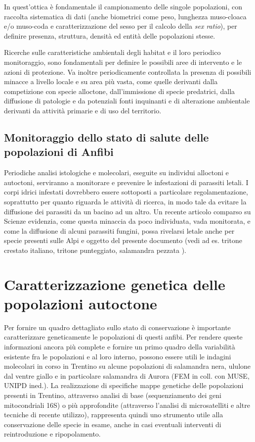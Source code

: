 \documentclass[10pt,twoside,openany,x11names,svgnames,italian,a5paper,dvipsnames,table]{memoir}
\begin{document}
In quest’ottica è fondamentale il campionamento delle singole popolazioni, con raccolta sistematica di dati (anche biometrici come peso, lunghezza muso-cloaca e/o muso-coda e caratterizzazione del sesso per il calcolo della \emph{sex ratio}), per definire presenza, struttura, densità ed entità delle popolazioni stesse. 

Ricerche sulle caratteristiche ambientali degli habitat e il loro periodico monitoraggio, sono fondamentali per definire le possibili aree di intervento e le azioni di protezione. Va inoltre periodicamente controllata la presenza di possibili minacce a livello locale e su area più vasta, come quelle derivanti dalla competizione con specie alloctone, dall’immissione di specie predatrici, dalla diffusione di patologie e da potenziali fonti inquinanti e di alterazione ambientale derivanti da attività primarie e di uso del territorio.

\subsection{Monitoraggio dello stato di salute delle popolazioni di Anfibi}
Periodiche analisi istologiche e molecolari, eseguite su individui alloctoni e autoctoni, serviranno a monitorare e prevenire le infestazioni di parassiti letali. I corpi idrici infestati dovrebbero essere sottoposti a particolare regolamentazione, soprattutto per quanto riguarda le attività di ricerca, in modo tale da evitare la diffusione dei parassiti da un bacino ad un altro. Un recente articolo comparso su Scienze evidenzia, come questa minaccia da poco individuata, vada monitorata, e come la diffusione di alcuni parassiti fungini, possa rivelarsi letale anche per specie presenti sulle Alpi e oggetto del presente documento (vedi ad es. tritone crestato italiano, tritone punteggiato, salamandra pezzata \cite{Martel14}).

\section{Caratterizzazione genetica delle popolazioni autoctone}
Per fornire un quadro dettagliato sullo stato di conservazione è importante caratterizzare geneticamente le popolazioni di questi anfibi. Per rendere queste informazioni ancora più complete e fornire un primo quadro della variabilità esistente fra le popolazioni e al loro interno, possono essere utili le indagini molecolari in corso in Trentino su alcune popolazioni di salamandra nera, ululone dal ventre giallo e in particolare salamandra di Aurora (FEM in coll. con MUSE, UNIPD ined.). La realizzazione di specifiche mappe genetiche delle popolazioni presenti in Trentino, attraverso analisi di base (sequenziamento dei geni mitocondriali 16S) o più approfondite (attraverso l’analisi di microsatelliti e altre tecniche di recente utilizzo), rappresenta quindi uno strumento utile alla conservazione delle specie in esame, anche in casi  eventuali interventi di reintroduzione e ripopolamento.
\end{document}
